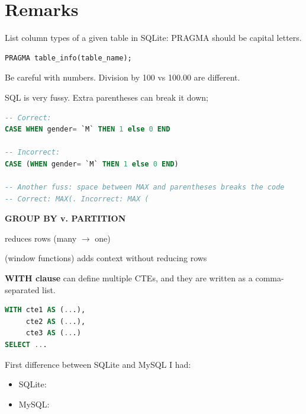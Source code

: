 \section{Remarks}
\label{sec:SQLRemarks}

\begin{rem} 
List column types of a given table in SQLite: PRAGMA should be capital letters. 
\begin{lstlisting}[language=SQL]
PRAGMA table_info(table_name); 
\end{lstlisting}
\end{rem}

\begin{rem} 
Be careful with numbers. Division by 100 vs 100.00 are different.
\end{rem} 

\begin{rem}
SQL is very fussy. Extra parentheses can break it down;
\begin{lstlisting}[language=SQL]
-- Correct: 
CASE WHEN gender= `M` THEN 1 else 0 END

-- Incorrect: 
CASE (WHEN gender= `M` THEN 1 else 0 END)

-- Another fuss: space between MAX and parentheses breaks the code 
-- Correct: MAX(. Incorrect: MAX (
\end{lstlisting}
\end{rem} 

\begin{rem} {\bf  GROUP BY v. PARTITION}

reduces rows (many $\rightarrow$ one)

 (window functions)
adds context without reducing rows
\end{rem} 



\begin{rem} {\bf WITH clause} can define multiple CTEs, and they are written as a comma-separated list.

\begin{lstlisting}[language=SQL]
WITH cte1 AS (...),
     cte2 AS (...),
     cte3 AS (...)
SELECT ...
\end{lstlisting}
\end{rem} 

\begin{rem} 
First difference between SQLite and MySQL I had:
\begin{itemize}
\item SQLite: 
\item MySQL: 
\end{itemize}
\end{rem} 



